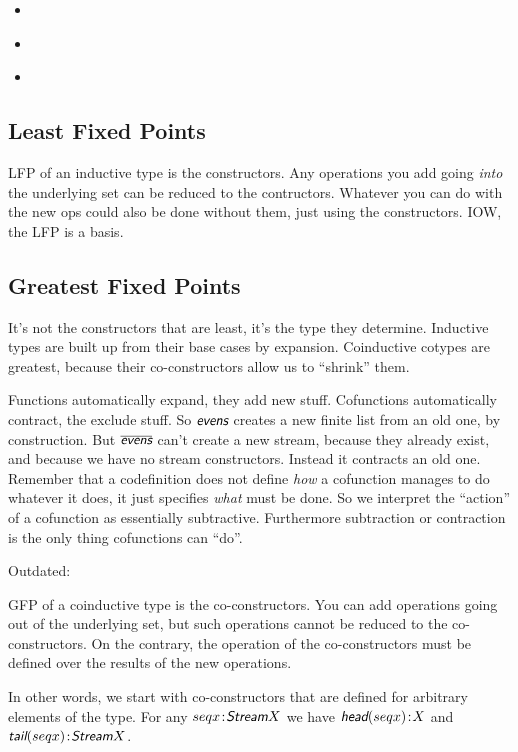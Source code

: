 \documentclass{article}
\begin{document}
\begin{itemize}
\item {} \cite{lawvere1997conceptual}
\item {} \cite{davey2002introduction}
\item {} \cite{stoy1977denotational}
\end{itemize}

\subsection{Least Fixed Points}

LFP of an inductive type is the constructors. Any operations you add
going \textit{into} the underlying set can be reduced to the
contructors. Whatever you can do with the new ops could also be done
without them, just using the constructors. IOW, the LFP is a basis.

\subsection{Greatest Fixed Points}

It's not the constructors that are least, it's the type they
determine. Inductive types are built up from their base cases by
expansion. Coinductive cotypes are greatest, because their
co-constructors allow us to ``shrink'' them.

Functions automatically expand, they add new stuff. Cofunctions
automatically contract, the exclude stuff. So \(\defn{evens}\) creates
a new finite list from an old one, by construction. But
\(\codefn{evens}\) can't create a new stream, because they already
exist, and because we have no stream constructors. Instead it
contracts an old one. Remember that a codefinition does not define
\textit{how} a cofunction manages to do whatever it does, it just
specifies \textit{what} must be done. So we interpret the ``action''
of a cofunction as essentially subtractive. Furthermore subtraction or
contraction is the only thing cofunctions can ``do''.

Outdated:

GFP of a coinductive type is the co-constructors. You can add
operations going out of the underlying set, but such operations cannot
be reduced to the co-constructors. On the contrary, the operation of
the co-constructors must be defined over the results of the new
operations.

In other words, we start with co-constructors that are defined for
arbitrary elements of the type. For any \(\tj{seq{x}}{\Stream X}\) we have
\(\tj{\head(seq{x})}{X}\) and \(\tj{\tail(seq{x})}{\Stream X}\).
\end{document}
